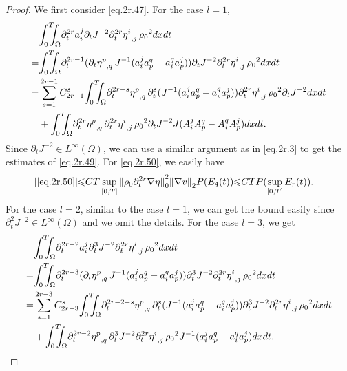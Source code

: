 \documentclass[12pt,twoside,reqno]{amsart}
\numberwithin{equation}{section}
\theoremstyle{definition}
\theoremstyle{remark}
\begin{document}
\begin{proof}
We first consider \eqref{eq.2r.47}. For the case $l=1$,
\begin{align}
  &{\int_0^T\!\!\!\!\int_\Omega }  {\partial}_t^{2r}a_i^j {\partial}_t J^{-2}{{{{\partial}_t^{2r}\eta^i}}_{,{j}}\,}{\rho_0}^2  dxdt{\nonumber}\\
  =&{\int_0^T\!\!\!\!\int_\Omega }  {\partial}_t^{2r-1}({{{{\partial}_t\eta^p}}_{,{q}}\,}J^{-1}(a_i^ja_p^q-a_i^qa_p^j)) {\partial}_t J^{-2}{{{{\partial}_t^{2r}\eta^i}}_{,{j}}\,}{\rho_0}^2  dxdt{\nonumber}\\
  =&\sum_{s=1}^{2r-1}C_{2r-1}^s{\int_0^T\!\!\!\!\int_\Omega }  {{{{\partial}_t^{2r-s}\eta^p}}_{,{q}}\,}{\partial}_t^s(J^{-1}(a_i^ja_p^q-a_i^qa_p^j)) {{{{\partial}_t^{2r}\eta^i}}_{,{j}}\,}{\rho_0}^2 {\partial}_t J^{-2} dxdt\label{eq.2r.49}\\
  &+{\int_0^T\!\!\!\!\int_\Omega }  {{{{\partial}_t^{2r}\eta^p}}_{,{q}}\,} {{{{\partial}_t^{2r}\eta^i}}_{,{j}}\,}{\rho_0}^2 {\partial}_t J^{-2}J(A_i^jA_p^q-A_i^qA_p^j) dxdt.\label{eq.2r.50}
\end{align}
Since ${\partial}_t J^{-2}\in L^\infty(\Omega)$, we can use a similar argument as in \eqref{eq.2r.3} to get the estimates of \eqref{eq.2r.49}. For \eqref{eq.2r.50}, we easily have
\begin{align*}
  {\vert{\eqref{eq.2r.50}}\vert}{\leqslant}&CT\sup_{[0,T]} {\Vert{{\rho_0} {\partial}_t^{2r}{\nabla}\eta}\Vert}_0^2 {\Vert{{\nabla} v}\Vert}_2P(E_4(t))
  {\leqslant} CTP(\sup_{[0,T]}E_r(t)).
\end{align*}
For the case $l=2$, similar to the case $l=1$, we can get the bound easily since ${\partial}_t^2 J^{-2}\in L^\infty(\Omega)$ and we omit the details. For the case $l=3$, we get
\begin{align}
  &{\int_0^T\!\!\!\!\int_\Omega }  {\partial}_t^{2r-2}a_i^j {\partial}_t^3 J^{-2}{{{{\partial}_t^{2r}\eta^i}}_{,{j}}\,}{\rho_0}^2  dxdt{\nonumber}\\
  =&{\int_0^T\!\!\!\!\int_\Omega }  {\partial}_t^{2r-3}({{{{\partial}_t\eta^p}}_{,{q}}\,}J^{-1}(a_i^ja_p^q-a_i^qa_p^j)) {\partial}_t^3 J^{-2}{{{{\partial}_t^{2r}\eta^i}}_{,{j}}\,}{\rho_0}^2  dxdt{\nonumber}\\
  =&\sum_{s=1}^{2r-3}C_{2r-3}^s{\int_0^T\!\!\!\!\int_\Omega }  {{{{\partial}_t^{2r-2-s}\eta^p}}_{,{q}}\,}{\partial}_t^s(J^{-1}(a_i^ja_p^q-a_i^qa_p^j)) {\partial}_t^3 J^{-2}{{{{\partial}_t^{2r}\eta^i}}_{,{j}}\,}{\rho_0}^2  dxdt\label{eq.2r.51}\\
  &+{\int_0^T\!\!\!\!\int_\Omega }  {{{{\partial}_t^{2r-2}\eta^p}}_{,{q}}\,} {\partial}_t^3 J^{-2}{{{{\partial}_t^{2r}\eta^i}}_{,{j}}\,}{\rho_0}^2  J^{-1}(a_i^ja_p^q-a_i^qa_p^j) dxdt.\label{eq.2r.52}

\end{align}
\end{proof}
\end{document}
